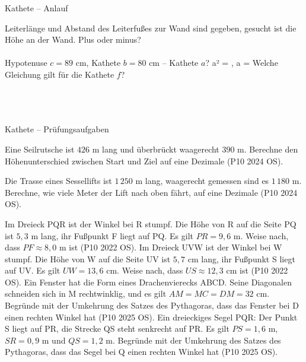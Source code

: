 \begin{aufgabe}{Kathete – Anlauf}
\begin{teile}
\teil Leiterlänge und Abstand des Leiterfußes zur Wand sind gegeben, gesucht ist die Höhe an der Wand. Plus oder minus? \\  \\ 
\teil Hypotenuse $c = 89$ cm, Kathete $b = 80$ cm – Kathete $a$? a² = \leerfeld , a = \leerfeld[cm]
\teil Welche Gleichung gilt für die Kathete $f$? \\  \\  \\  \\ 

\end{teile}
\end{aufgabe}

\begin{aufgabe}{Kathete – Prüfungsaufgaben}
\begin{teile}
\teil Eine Seilrutsche ist $426$ m lang und überbrückt waagerecht $390$ m. Berechne den Höhenunterschied zwischen Start und Ziel auf eine Dezimale \hfill (P10 2024 OS).

\leerfeld[m]
\teil Die Trasse eines Sessellifts ist $1\,250$ m lang, waagerecht gemessen sind es $1\,180$ m. Berechne, wie viele Meter der Lift nach oben fährt, auf eine Dezimale \hfill (P10 2024 OS).

\leerfeld[m]
\teil Im Dreieck PQR ist der Winkel bei R stumpf. Die Höhe von R auf die Seite PQ ist $5{,}3$ m lang, ihr Fußpunkt F liegt auf PQ. Es gilt $PR = 9{,}6$ m. Weise nach, dass $PF \approx 8{,}0$ m ist \hfill (P10 2022 OS).
\teil Im Dreieck UVW ist der Winkel bei W stumpf. Die Höhe von W auf die Seite UV ist $5{,}7$ cm lang, ihr Fußpunkt S liegt auf UV. Es gilt $UW = 13{,}6$ cm. Weise nach, dass $US \approx 12{,}3$ cm ist \hfill (P10 2022 OS).
\steil Ein Fenster hat die Form eines Drachenvierecks ABCD. Seine Diagonalen schneiden sich in M rechtwinklig, und es gilt $AM = MC = DM = 32$ cm. Begründe mit der Umkehrung des Satzes des Pythagoras, dass das Fenster bei D einen rechten Winkel hat \hfill (P10 2025 OS).
\steil Ein dreieckiges Segel PQR: Der Punkt S liegt auf PR, die Strecke QS steht senkrecht auf PR. Es gilt $PS = 1{,}6$ m, $SR = 0{,}9$ m und $QS = 1{,}2$ m. Begründe mit der Umkehrung des Satzes des Pythagoras, dass das Segel bei Q einen rechten Winkel hat \hfill (P10 2025 OS).
\end{teile}
\end{aufgabe}

